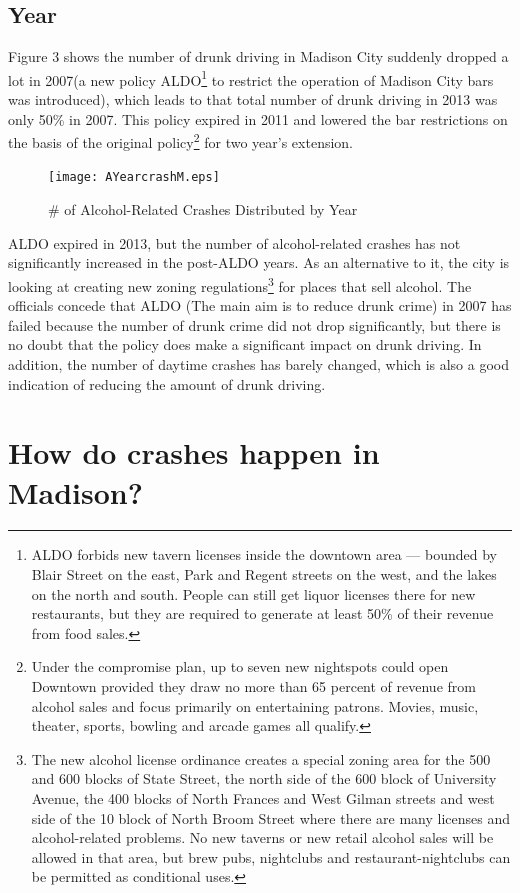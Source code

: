 \documentclass[15pt]{article}
\begin{document}
\newpage
\subsection{Year}
Figure 3 shows the number of drunk driving in Madison City suddenly dropped a lot in 2007(a new policy ALDO\footnote{ALDO forbids new tavern licenses inside the downtown area — bounded by Blair Street on the east, Park and Regent streets on the west, and the lakes on the north and south. People can still get liquor licenses there for new restaurants, but they are required to generate at least 50\% of their revenue from food sales.} to restrict the operation of Madison City bars was introduced), which leads to that total number of drunk driving in 2013 was only 50\% in 2007. This policy expired in 2011 and lowered the bar restrictions on the basis of the original policy\footnote{Under the compromise plan, up to seven new nightspots could open Downtown provided they draw no more than 65 percent of revenue from alcohol sales and focus primarily on entertaining patrons. Movies, music, theater, sports, bowling and arcade games all qualify.} for two year's extension.
\begin{figure}[H]
\centering
\texttt{[image: AYearcrashM.eps]}
\caption{\# of Alcohol-Related Crashes Distributed by Year}
\end{figure}
ALDO expired in 2013, but the number of alcohol-related crashes has not significantly increased in the post-ALDO years. As an alternative to it, the city is looking at creating new zoning regulations\footnote{The new alcohol license ordinance creates a special zoning area for the 500 and 600 blocks of State Street, the north side of the 600 block of University Avenue, the 400 blocks of North Frances and West Gilman streets and west side of the 10 block of North Broom Street where there are many licenses and alcohol-related problems. No new taverns or new retail alcohol sales will be allowed in that area, but brew pubs, nightclubs and restaurant-nightclubs can be permitted as conditional uses.} for places that sell alcohol. The officials concede that ALDO (The main aim is to reduce drunk crime) in 2007 has failed because the number of drunk crime did not drop significantly, but there is no doubt that the policy does make a significant impact on drunk driving. In addition, the number of daytime crashes has barely changed, which is also a good indication of reducing the amount of drunk driving.

\section{How do crashes happen in Madison?}
\end{document}
